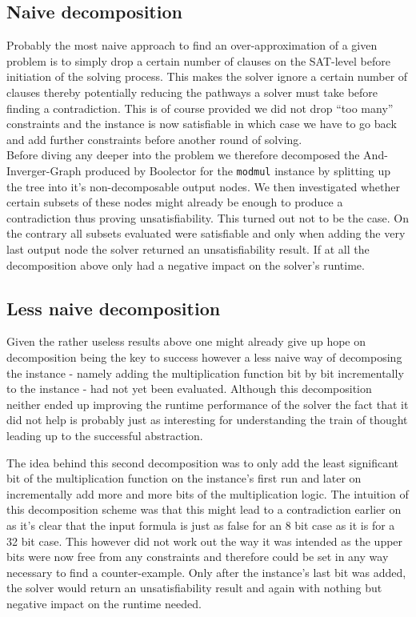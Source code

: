 \subsection{Naive decomposition}
Probably the most naive approach to find an over-approximation of a given problem is to simply drop a certain number of clauses on the SAT-level before initiation of the solving process. This makes the solver ignore a certain number of clauses thereby potentially reducing the pathways a solver must take before finding a contradiction. This is of course provided we did not drop \enquote{too many} constraints and the instance is now satisfiable in which case we have to go back and add further constraints before another round of solving.\\
Before diving any deeper into the problem we therefore decomposed the And-Inverger-Graph \cite{Biere-FMV-TR-11-2-AIGER}  produced by Boolector for the \texttt{modmul} instance by splitting up the tree into it's non-decomposable output nodes. We then investigated whether certain subsets of these nodes might already be enough to produce a contradiction thus proving unsatisfiability. This turned out not to be the case. On the contrary all subsets evaluated were satisfiable and only when adding the very last output node the solver returned an unsatisfiability result. If at all the decomposition above only had a negative impact on the solver's runtime.

\subsection{Less naive decomposition}

Given the rather useless results above one might already give up hope on decomposition being the key to success however a less naive way of decomposing the instance - namely adding the multiplication function bit by bit incrementally to the instance - had not yet been evaluated. Although this decomposition neither ended up improving the runtime performance of the solver the fact that it did not help is probably just as interesting for understanding the train of thought leading up to the successful abstraction. 
\par
The idea behind this second decomposition was to only add the least significant bit of the multiplication function on the instance's first run and later on incrementally add more and more bits of the multiplication logic. The intuition of this decomposition scheme was that this might lead to a contradiction earlier on as it's clear that the input formula is just as false for an 8 bit case as it is for a 32 bit case. This however did not work out the way it was intended as the upper bits were now free from any constraints and therefore could be set in any way necessary to find a counter-example. Only after the instance's last bit was added, the solver would return an unsatisfiability result and again with nothing but negative impact on the runtime needed.

